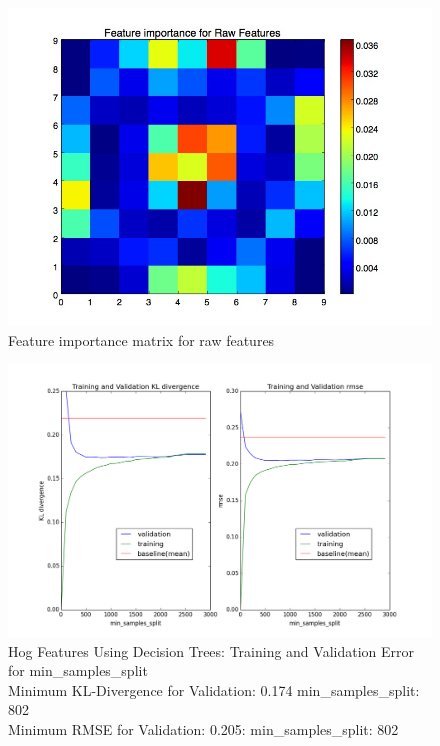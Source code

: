 \documentclass[10pt]{article}
\begin{document}
\begin{figure}
\begin{center}
\includegraphics[scale=0.4]{images/Raw_Features_DT_Heatmap.jpg}
\caption{Feature importance matrix for raw features}
\label{fig:rawdtheat}
\end{center}
\end{figure}

\begin{figure}
\begin{center}
\includegraphics[scale=0.4]{images/HoG_DecisionTreeCV.png}
\caption{Hog Features Using Decision Trees: Training and Validation Error for min\_samples\_split \\
         Minimum KL-Divergence for Validation: 0.174 min\_samples\_split: 802 \\
         Minimum RMSE for Validation: 0.205: min\_samples\_split: 802}
\label{fig:hogdreval}
\end{center}
\end{figure}
\end{document}
